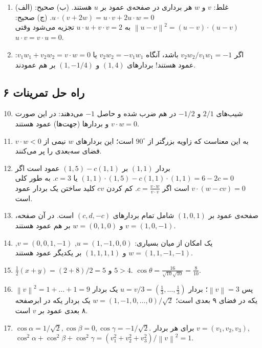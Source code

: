 \documentclass[12pt,a4paper]{article}
\newcommand{\norm}[1]{\left\lVert#1\right\rVert}
\begin{document}
{\begin{enumerate}
			\item (الف) غلط: $v$ و $w$ هر برداری در صفحه‌ی عمود بر $u$ هستند. (ب) صحیح: $u \cdot (v+2w) = u \cdot v + 2u \cdot w = 0$. (ج) صحیح: $\norm{u-v}^2 = (u-v) \cdot (u-v)$ به $u \cdot u + v \cdot v = 2$ تجزیه می‌شود وقتی $u \cdot v = v \cdot u = 0$.
			
			\item اگر $v_2w_2/v_1w_1 = -1$ باشد، آنگاه $v_2w_2 = -v_1w_1$ یا $v_1w_1 + v_2w_2 = v \cdot w = 0$: عمود هستند! بردارهای $(1,4)$ و $(1, -1/4)$ بر هم عمودند.
		\end{enumerate}
		
		\subsection*{راه حل تمرینات ۶}
		\begin{enumerate}
			\setcounter{enumi}{9}
			\item شیب‌های $2/1$ و $-1/2$ در هم ضرب شده و حاصل $-1$ می‌دهند: در این صورت $v \cdot w = 0$ و بردارها (جهت‌ها) عمود هستند.
			
			\item $v \cdot w < 0$ به این معناست که زاویه بزرگتر از $90^\circ$ است؛ این بردارهای $w$ نیمی از فضای سه‌بعدی را پر می‌کنند.
			
			\item بردار $(1,1)$ بر $(1,5)-c(1,1)$ عمود است اگر $(1,1) \cdot (1,5) - c(1,1) \cdot (1,1) = 6-2c = 0$ یا $c=3$. به طور کلی $v \cdot (w-cv) = 0$ است اگر $c = \frac{v \cdot w}{v \cdot v}$. کم کردن $cv$ کلید ساختن یک بردار عمود است.
			
			\item صفحه‌ی عمود بر $(1,0,1)$ شامل تمام بردارهای $(c,d,-c)$ است. در آن صفحه، $v=(1,0,-1)$ و $w=(0,1,0)$ بر هم عمود هستند.
			
			\item یک امکان از میان بسیاری: $u=(1,-1,0,0)$, $v=(0,0,1,-1)$, $w=(1,1,-1,-1)$ و $(1,1,1,1)$ بر یکدیگر عمود هستند.
			
			\item $\frac{1}{2}(x+y) = (2+8)/2 = 5$ و $5 > 4$. $\cos\theta = \frac{16}{\sqrt{10}\sqrt{10}} = \frac{8}{10}$.
			
			\item $\norm{v}^2 = 1+\dots+1=9$ پس $\norm{v}=3$؛ بردار $u=v/3 = (\frac{1}{3}, \dots, \frac{1}{3})$ یک بردار یکه در فضای ۹ بعدی است؛ $w=(1,-1,0,\dots,0)/\sqrt{2}$ یک بردار یکه در ابرصفحه ۸ بعدی عمود بر $v$ است.
			
			\item $\cos\alpha=1/\sqrt{2}, \cos\beta=0, \cos\gamma=-1/\sqrt{2}$. برای هر بردار $v=(v_1,v_2,v_3)$, $\cos^2\alpha+\cos^2\beta+\cos^2\gamma = (v_1^2+v_2^2+v_3^2)/\norm{v}^2 = 1$.
			

\end{enumerate}}
\end{document}
